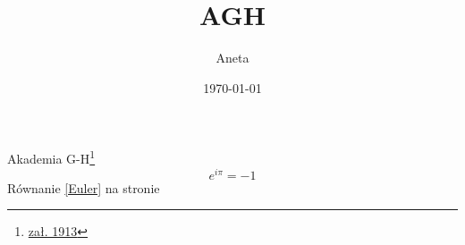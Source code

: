 \documentclass{article}
\title{AGH}
\author{Aneta}
\date{\today}
\begin{document}
    \maketitle
    Akademia G-H\footnote{\href{https://www.agh.edu.pl/o-agh/historia-i-tradycja}{zał. 1913}}
    \begin{equation}\label{Euler}
        e^{i\pi}=-1
    \end{equation}
    Równanie \eqref{Euler} na stronie \pageref{Euler}
\end{document}
